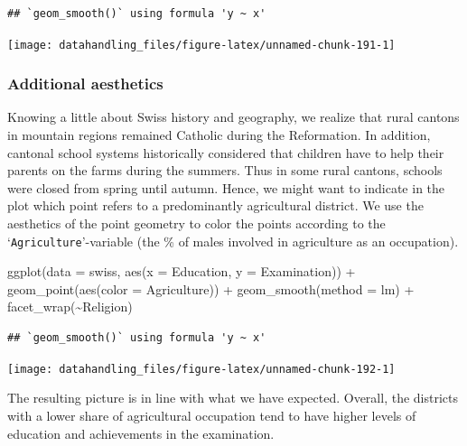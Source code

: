 \documentclass[
  12pt,
]{style/krantz}
\newenvironment{Shaded}{\begin{snugshade}}{\end{snugshade}}
\newcommand{\AttributeTok}[1]{\textcolor[rgb]{0.77,0.63,0.00}{#1}}
\newcommand{\FunctionTok}[1]{\textcolor[rgb]{0.00,0.00,0.00}{#1}}
\newcommand{\NormalTok}[1]{#1}
\newcommand{\SpecialCharTok}[1]{\textcolor[rgb]{0.00,0.00,0.00}{#1}}
\newcommand{\StringTok}[1]{\textcolor[rgb]{0.31,0.60,0.02}{#1}}
\begin{document}
\begin{verbatim}
## `geom_smooth()` using formula 'y ~ x'
\end{verbatim}

\texttt{[image: datahandling\_files/figure-latex/unnamed-chunk-191-1]}

\hypertarget{additional-aesthetics}{%
\subsubsection{Additional aesthetics}\label{additional-aesthetics}}

Knowing a little about Swiss history and geography, we realize that rural cantons in mountain regions remained Catholic during the Reformation. In addition, cantonal school systems historically considered that children have to help their parents on the farms during the summers. Thus in some rural cantons, schools were closed from spring until autumn. Hence, we might want to indicate in the plot which point refers to a predominantly agricultural district. We use the aesthetics of the point geometry to color the points according to the `\texttt{Agriculture}'-variable (the \% of males involved in agriculture as an occupation).

\begin{Shaded}
\begin{Highlighting}[]
\FunctionTok{ggplot}\NormalTok{(}\AttributeTok{data =}\NormalTok{ swiss, }\FunctionTok{aes}\NormalTok{(}\AttributeTok{x =}\NormalTok{ Education, }\AttributeTok{y =}\NormalTok{ Examination)) }\SpecialCharTok{+}
     \FunctionTok{geom\_point}\NormalTok{(}\FunctionTok{aes}\NormalTok{(}\AttributeTok{color =}\NormalTok{ Agriculture)) }\SpecialCharTok{+}
     \FunctionTok{geom\_smooth}\NormalTok{(}\AttributeTok{method =} \StringTok{\textquotesingle{}lm\textquotesingle{}}\NormalTok{) }\SpecialCharTok{+}
     \FunctionTok{facet\_wrap}\NormalTok{(}\SpecialCharTok{\textasciitilde{}}\NormalTok{Religion)}
\end{Highlighting}
\end{Shaded}

\begin{verbatim}
## `geom_smooth()` using formula 'y ~ x'
\end{verbatim}

\texttt{[image: datahandling\_files/figure-latex/unnamed-chunk-192-1]}

The resulting picture is in line with what we have expected. Overall, the districts with a lower share of agricultural occupation tend to have higher levels of education and achievements in the examination.
\end{document}
